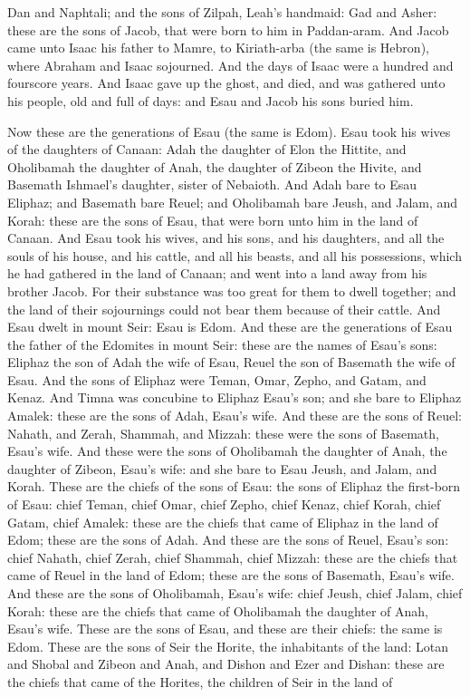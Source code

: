 Dan and Naphtali; and the sons of Zilpah, Leah’s handmaid: Gad and Asher: these are the sons of Jacob, that were born to him in Paddan-aram. And Jacob came unto Isaac his father to Mamre, to Kiriath-arba (the same is Hebron), where Abraham and Isaac sojourned.  And the days of Isaac were a hundred and fourscore years. And Isaac gave up the ghost, and died, and was gathered unto his people, old and full of days: and Esau and Jacob his sons buried him. 

Now these are the generations of Esau (the same is Edom). Esau took his wives of the daughters of Canaan: Adah the daughter of Elon the Hittite, and Oholibamah the daughter of Anah, the daughter of Zibeon the Hivite, and Basemath Ishmael’s daughter, sister of Nebaioth. And Adah bare to Esau Eliphaz; and Basemath bare Reuel; and Oholibamah bare Jeush, and Jalam, and Korah: these are the sons of Esau, that were born unto him in the land of Canaan. And Esau took his wives, and his sons, and his daughters, and all the souls of his house, and his cattle, and all his beasts, and all his possessions, which he had gathered in the land of Canaan; and went into a land away from his brother Jacob. For their substance was too great for them to dwell together; and the land of their sojournings could not bear them because of their cattle. And Esau dwelt in mount Seir: Esau is Edom.  And these are the generations of Esau the father of the Edomites in mount Seir: these are the names of Esau’s sons: Eliphaz the son of Adah the wife of Esau, Reuel the son of Basemath the wife of Esau. And the sons of Eliphaz were Teman, Omar, Zepho, and Gatam, and Kenaz. And Timna was concubine to Eliphaz Esau’s son; and she bare to Eliphaz Amalek: these are the sons of Adah, Esau’s wife. And these are the sons of Reuel: Nahath, and Zerah, Shammah, and Mizzah: these were the sons of Basemath, Esau’s wife. And these were the sons of Oholibamah the daughter of Anah, the daughter of Zibeon, Esau’s wife: and she bare to Esau Jeush, and Jalam, and Korah.  These are the chiefs of the sons of Esau: the sons of Eliphaz the first-born of Esau: chief Teman, chief Omar, chief Zepho, chief Kenaz, chief Korah, chief Gatam, chief Amalek: these are the chiefs that came of Eliphaz in the land of Edom; these are the sons of Adah. And these are the sons of Reuel, Esau’s son: chief Nahath, chief Zerah, chief Shammah, chief Mizzah: these are the chiefs that came of Reuel in the land of Edom; these are the sons of Basemath, Esau’s wife. And these are the sons of Oholibamah, Esau’s wife: chief Jeush, chief Jalam, chief Korah: these are the chiefs that came of Oholibamah the daughter of Anah, Esau’s wife. These are the sons of Esau, and these are their chiefs: the same is Edom.  These are the sons of Seir the Horite, the inhabitants of the land: Lotan and Shobal and Zibeon and Anah, and Dishon and Ezer and Dishan: these are the chiefs that came of the Horites, the children of Seir in the land of 